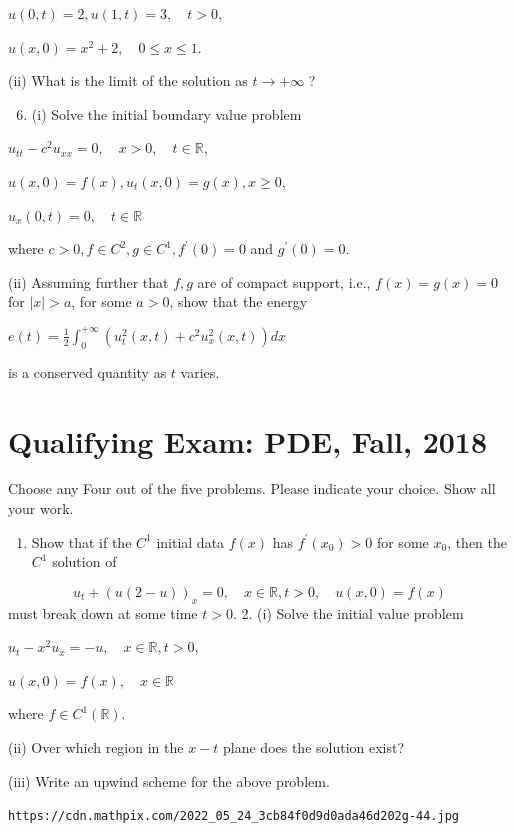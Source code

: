 \documentclass[10pt]{article}
\begin{document}
$u(0, t)=2, u(1, t)=3, \quad t>0$,

$u(x, 0)=x^{2}+2, \quad 0 \leq x \leq 1 .$

(ii) What is the limit of the solution as $t \rightarrow+\infty$ ?

\begin{enumerate}
  \setcounter{enumi}{5}
  \item (i) Solve the initial boundary value problem
\end{enumerate}
$u_{t t}-c^{2} u_{x x}=0, \quad x>0, \quad t \in \mathbb{R}$,

$u(x, 0)=f(x), u_{t}(x, 0)=g(x), x \geq 0$,

$u_{x}(0, t)=0, \quad t \in \mathbb{R}$

where $c>0, f \in C^{2}, g \in C^{1}, f^{\prime}(0)=0$ and $g^{\prime}(0)=0$.

(ii) Assuming further that $f, g$ are of compact support, i.e., $f(x)=g(x)=0$ for $|x|>a$, for some $a>0$, show that the energy

$e(t)=\frac{1}{2} \int_{0}^{+\infty}\left(u_{t}^{2}(x, t)+c^{2} u_{x}^{2}(x, t)\right) d x$

is a conserved quantity as $t$ varies.

\section{Qualifying Exam: PDE, Fall, 2018}
Choose any Four out of the five problems. Please indicate your choice. Show all your work.

\begin{enumerate}
  \item Show that if the $C^{1}$ initial data $f(x)$ has $f^{\prime}\left(x_{0}\right)>0$ for some $x_{0}$, then the $C^{1}$ solution of
\end{enumerate}
$$
u_{t}+(u(2-u))_{x}=0, \quad x \in \mathbb{R}, t>0, \quad u(x, 0)=f(x)
$$
must break down at some time $t>0$. 2. (i) Solve the initial value problem

$u_{t}-x^{2} u_{x}=-u, \quad x \in \mathbb{R}, t>0$,

$u(x, 0)=f(x), \quad x \in \mathbb{R}$

where $f \in C^{1}(\mathbb{R})$.

(ii) Over which region in the $x-t$ plane does the solution exist?

(iii) Write an upwind scheme for the above problem.

\texttt{https://cdn.mathpix.com/2022_05_24_3cb84f0d9d0ada46d202g-44.jpg}
\end{document}
